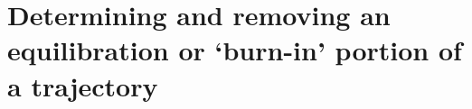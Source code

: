 \section{Determining and removing an equilibration or `burn-in' portion of a trajectory}
\label{sec:equil}
